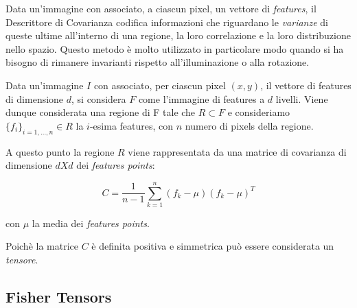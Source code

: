 Data un'immagine con associato, a ciascun pixel, un vettore di \emph{features}, il Descrittore di Covarianza codifica informazioni che riguardano le \emph{varianze} di queste ultime all'interno di una regione, la loro correlazione e la loro distribuzione nello spazio. Questo metodo è molto utilizzato in particolare modo quando si ha bisogno di rimanere invarianti rispetto all'illuminazione o alla rotazione.

Data un'immagine $I$ con associato, per ciascun pixel $(x, y)$, il vettore di features di dimensione $d$, si considera $F$ come l'immagine di features a $d$ livelli. Viene dunque considerata una regione di F tale che $R \subset F$ e consideriamo $\{f_i\}_{i = 1,\ldots, n} \in R$ la $i$-esima features, con $n$ numero di pixels della regione.

A questo punto la regione $R$ viene rappresentata da una matrice di covarianza di dimensione $d X d$ dei \emph{features points}:

$$C = \frac{1}{n -1} \sum_{k = 1}^{n} (f_k - \mu)(f_k - \mu)^T$$

con $\mu$ la media dei \emph{features points}.

Poichè la matrice $C$ è definita positiva e simmetrica può essere considerata un \emph{tensore}. 

\subsection{Fisher Tensors}